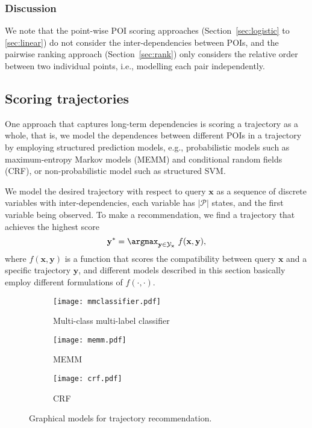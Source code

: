 \subsubsection{Discussion}

We note that the point-wise POI scoring approaches (Section~\ref{sec:logistic} to \ref{sec:linear}) do not consider the inter-dependencies between POIs,
and the pairwise ranking approach (Section~\ref{sec:rank}) only considers the relative order between two individual points,
i.e., modelling each pair independently.



\subsection{Scoring trajectories}
\label{sec:structured}

One approach that captures long-term dependencies is scoring a trajectory as a whole,
that is, we model the dependences between different POIs in a trajectory by employing structured prediction models,
e.g., probabilistic models such as maximum-entropy Markov models (MEMM) and conditional random fields (CRF),
or non-probabilistic model such as structured SVM.

We model the desired trajectory with respect to query $\mathbf{x}$ as a sequence of discrete variables with inter-dependencies,
each variable has $|\mathcal{P}|$ states, and the first variable being observed.
To make a recommendation, we find a trajectory that achieves the highest score
\begin{equation*}
\mathbf{y}^* = \argmax_{\mathbf{y} \in \mathcal{Y}_\mathbf{x}}~ f(\mathbf{x}, \mathbf{y}),
\end{equation*}
where $f(\mathbf{x}, \mathbf{y})$ is a function that scores the compatibility between query $\mathbf{x}$ and a specific trajectory $\mathbf{y}$,
and different models described in this section basically employ different formulations of $f(\cdot,\cdot)$. %


\begin{figure}[t]
    \centering
    \begin{subfigure}[t]{.33\textwidth} %
        \centering
        \texttt{[image: mmclassifier.pdf]} %
        \caption{Multi-class multi-label classifier}
    \end{subfigure}
    \begin{subfigure}[t]{.33\textwidth}
        \centering
        \texttt{[image: memm.pdf]}
        \caption{MEMM}
    \end{subfigure}
    \begin{subfigure}[t]{.33\textwidth}
        \centering
        \texttt{[image: crf.pdf]}
        \caption{CRF}
    \end{subfigure}
    \caption{Graphical models for trajectory recommendation.}
    \label{fig:pgm}
\end{figure}


